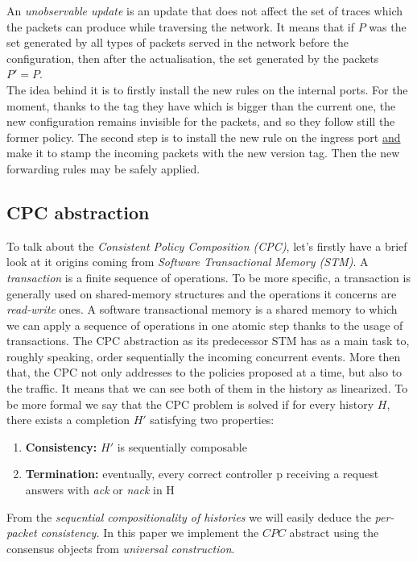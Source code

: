 \documentclass{article}
\begin{document}
An \emph{unobservable update} is an update that does not affect the set of traces which the packets can produce while traversing the network. It means that if $P$ was the set generated by all types of packets served in the network before the configuration, then after the actualisation, the set generated by the packets $P'=P$.\\ 
The idea behind it is to firstly install the new rules on the internal ports. For the moment, thanks to the tag they have which is bigger than the current one, the new configuration remains invisible for the packets, and so they follow still the former policy. The second step is to install the new rule on the ingress port \underline{and} make it to stamp the incoming packets with the new version tag. Then the new forwarding rules may be safely applied.
\subsection{CPC abstraction}
To talk about the \emph{Consistent Policy Composition (CPC)}, let's firstly have a brief look at it origins coming from \emph{Software Transactional Memory (STM)}\cite{Shavit:1995:STM:224964.224987}. A \emph{transaction} is a finite sequence of operations. To be more specific, a transaction is generally used on shared-memory structures and the operations it concerns are \emph{read-write} ones. A software transactional memory is a shared memory to which we can apply a sequence of operations in one atomic step thanks to the usage of transactions.
The CPC abstraction as its predecessor STM has as a main task to, roughly speaking, order sequentially the incoming concurrent events. More then that, the CPC not only addresses to the policies proposed at a time, but also to the traffic. It means that we can see both of them in the history as linearized. To be more formal we say that the CPC problem is solved if for every history $H$, there exists a completion $H'$ satisfying two properties:
\begin{enumerate}
\item \textbf{Consistency:} $H'$ is sequentially composable
\item \textbf{Termination:} eventually, every correct controller p receiving a request answers with \emph{ack} or \emph{nack} in H
\end{enumerate}
From the \emph{sequential compositionality of histories} we will easily deduce the \emph{per-packet consistency.} 
In this paper we implement the $CPC$ abstract using the consensus objects from \emph{universal construction}.
\end{document}
